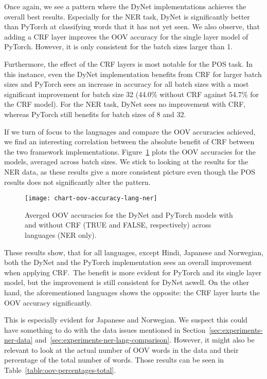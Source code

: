 Once again, we see a pattern where the DyNet implementations achieves the
overall best results. Especially for the NER task, DyNet is significantly better
than PyTorch at classifying words that it has not yet seen. We also observe,
that adding a CRF layer improves the OOV accuracy for the single layer model of
PyTorch. However, it is only consistent for the batch sizes larger than 1.

Furthermore, the effect of the CRF layers is most notable for the POS task.
In this instance, even the DyNet implementation benefits from CRF for larger
batch sizes and PyTorch sees an increase in accuracy for all batch sizes with a
most significant improvement for batch size 32 (44.0\% without CRF against
54.7\% for the CRF model). For the NER task, DyNet sees no improvement with
CRF, whereas PyTorch still benefits for batch sizes of 8 and 32.

If we turn of focus to the languages and compare the OOV accuracies achieved, we
find an interesting correlation between the absolute benefit of CRF between the
two framework implementations. Figure~\ref{chart:oov-accuracy-lang-ner} plots
the OOV accuracies for the models, averaged across batch sizes. We stick to
looking at the results for the NER data, as these results give a more consistent
picture even though the POS results does not significantly alter the pattern.

\begin{figure}[h!]
    \texttt{[image: chart-oov-accuracy-lang-ner]}
    \caption{Averged OOV accuracies for the DyNet and PyTorch models with and
        without CRF (TRUE and FALSE, respectively) across languages (NER only).
    }\label{chart:oov-accuracy-lang-ner}
\end{figure}

These results show, that for all languages, except Hindi, Japanese and
Norwegian, both the DyNet and the PyTorch implementation sees an overall
improvement when applying CRF.\ The benefit is more evident for PyTorch and its
single layer model, but the improvement is still consistent for DyNet aswell. On
the other hand, the aforementioned languages shows the opposite: the CRF layer
hurts the OOV accuracy significantly.

This is especially evident for Japanese and Norwegian. We suspect this could
have something to do with the data issues mentioned in
Section~\ref{sec:experiments-ner-data}
and~\ref{sec:experiments-ner-lang-comparison}. However, it might also be
relevant to look at the actual number of OOV words in the data and their
percentage of the total number of words. Those results can be seen in
Table~\ref{table:oov-percentages-total}.

